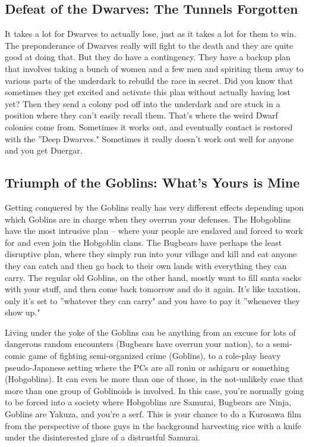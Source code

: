 \subsection{Defeat of the Dwarves: The Tunnels Forgotten}

It takes a lot for Dwarves to actually lose, just as it takes a lot for them to win. The preponderance of Dwarves really will fight to the death and they are quite good at doing that. But they do have a contingency. They have a backup plan that involves taking a bunch of women and a few men and spiriting them away to various parts of the underdark to rebuild the race in secret. Did you know that sometimes they get excited and activate this plan without actually having lost yet? Then they send a colony pod off into the underdark and are stuck in a position where they can't easily recall them. That's where the weird Dwarf colonies come from. Sometimes it works out, and eventually contact is restored with the ''Deep Dwarves." Sometimes it really doesn't work out well for anyone and you get Duergar.

\subsection{Triumph of the Goblins: What's Yours is Mine}

Getting conquered by the Goblins really has very different effects depending upon which Goblins are in charge when they overrun your defenses. The Hobgoblins have the most intrusive plan -- where your people are enslaved and forced to work for and even join the Hobgoblin clans. The Bugbears have perhaps the least disruptive plan, where they simply run into your village and kill and eat anyone they can catch and then go back to their own lands with everything they can carry. The regular old Goblins, on the other hand, mostly want to fill santa sacks with your stuff, and then come back tomorrow and do it again. It's like taxation, only it's set to ''whatever they can carry" and you have to pay it ''whenever they show up."

Living under the yoke of the Goblins can be anything from an excuse for lots of dangerous random encounters (Bugbears have overrun your nation), to a semi-comic game of fighting semi-organized crime (Goblins), to a role-play heavy pseudo-Japanese setting where the PCs are all ronin or ashigaru or something (Hobgoblins). It can even be more than one of those, in the not-unlikely case that more than one group of Goblinoids is involved. In this case, you're normally going to be forced into a society where Hobgoblins are Samurai, Bugbears are Ninja, Goblins are Yakuza, and you're a serf. This is your chance to do a Kurosawa film from the perspective of those guys in the background harvesting rice with a knife under the disinterested glare of a distrustful Samurai.


